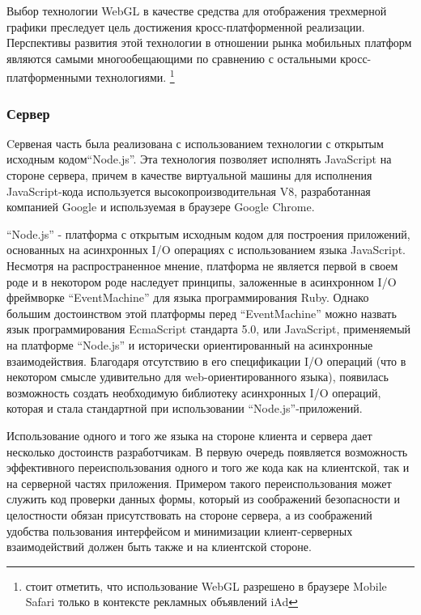 \documentclass[14pt, a4paper]{extarticle}
\begin{document}
Выбор технологии WebGL в качестве средства для отображения трехмерной графики
преследует цель достижения кросс-платформенной реализации. Перспективы развития
этой технологии в отношении рынка мобильных платформ являются самыми
многообещающими по сравнению с остальными кросс-платформенными технологиями.
\footnote{стоит отметить, что использование WebGL разрешено в браузере Mobile
Safari только в контексте рекламных объявлений iAd}

\subsubsection{Сервер}

Cервеная часть была реализована с использованием технологии с открытым исходным
кодом``Node.js''. Эта технология позволяет исполнять JavaScript на стороне
сервера, причем в качестве виртуальной машины для исполнения JavaScript-кода
используется высокопроизводительная V8, разработанная компанией Google и
используемая в браузере Google Chrome.

``Node.js''\cite{nodejs} - платформа с открытым исходным кодом для построения приложений,
основанных на асинхронных I/O операциях с использованием языка JavaScript.
Несмотря на распространенное мнение, платформа не является первой в своем роде и
в некотором роде наследует принципы, заложенные в асинхронном I/O фреймворке
``EventMachine'' для языка программирования Ruby. Однако большим достоинством
этой платформы перед ``EventMachine'' можно назвать язык программирования
EcmaScript стандарта 5.0, или JavaScript, применяемый на платформе ``Node.js'' и
исторически ориентированный на асинхронные взаимодействия.  Благодаря отсутствию
в его спецификации I/O операций (что в некотором смысле удивительно для
web-ориентированного языка), появилась возможность создать необходимую
библиотеку асинхронных I/O операций, которая и стала стандартной при
использовании ``Node.js''-приложений.

Использование одного и того же языка на стороне клиента и сервера дает несколько
достоинств разработчикам. В первую очередь появляется возможность эффективного
переиспользования одного и того же кода как на клиентской, так и на серверной
частях приложения. Примером такого переиспользования может служить
код проверки данных формы, который из соображений безопасности и целостности
обязан присутствовать на стороне сервера, а из соображений удобства пользования
интерфейсом и минимизации клиент-серверных взаимодействий должен быть также и на
клиентской стороне.
\end{document}
